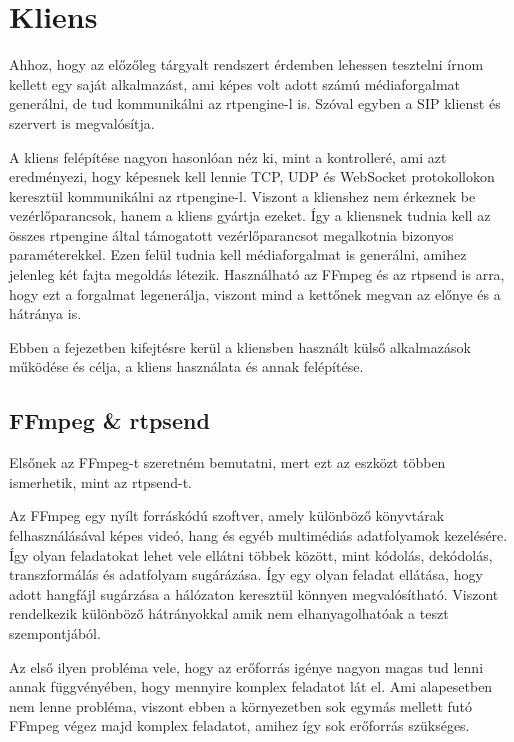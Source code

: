 \chapter{Kliens}

Ahhoz, hogy az előzőleg tárgyalt rendszert érdemben lehessen tesztelni írnom
kellett egy saját alkalmazást, ami képes volt adott számú médiaforgalmat 
generálni, de tud kommunikálni az rtpengine-l is. Szóval egyben a SIP
klienst és szervert is megvalósítja.

A kliens felépítése nagyon hasonlóan néz ki, mint a kontrolleré, ami azt 
eredményezi, hogy képesnek kell lennie  TCP, UDP és WebSocket protokollokon
keresztül kommunikálni az rtpengine-l. Viszont a klienshez nem érkeznek be 
vezérlőparancsok, hanem a kliens gyártja ezeket. Így a kliensnek tudnia kell
az összes rtpengine által támogatott vezérlőparancsot megalkotnia bizonyos 
paraméterekkel. Ezen felül tudnia kell médiaforgalmat is generálni, amihez
jelenleg két fajta megoldás létezik. Használható az FFmpeg és az rtpsend 
is arra, hogy ezt a forgalmat legenerálja, viszont mind a kettőnek megvan
az előnye és a hátránya is. 

Ebben a fejezetben kifejtésre kerül a kliensben használt külső alkalmazások
működése és célja, a kliens használata és annak felépítése. 

\section{FFmpeg \& rtpsend}

Elsőnek az FFmpeg-t szeretném bemutatni, mert ezt az eszközt többen ismerhetik,
mint az rtpsend-t. 

Az FFmpeg \cite{ffmpeg} egy nyílt forráskódú szoftver, amely különböző könyvtárak felhasználásával
képes videó, hang és egyéb multimédiás adatfolyamok kezelésére. Így olyan feladatokat
lehet vele ellátni többek között, mint kódolás, dekódolás, transzformálás és 
adatfolyam sugárázása. Így egy olyan feladat ellátása, hogy adott hangfájl sugárzása a 
hálózaton keresztül könnyen megvalósítható. Viszont rendelkezik különböző hátrányokkal
amik nem elhanyagolhatóak a teszt szempontjából.

Az első ilyen probléma vele, hogy az erőforrás igénye nagyon magas tud lenni 
annak függvényében, hogy mennyire komplex feladatot lát el. Ami alapesetben nem lenne
probléma, viszont ebben a környezetben sok egymás mellett futó FFmpeg végez majd
komplex feladatot, amihez így sok erőforrás szükséges.


